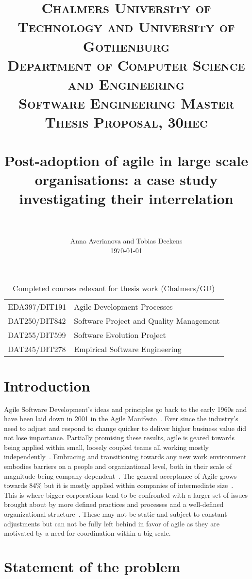 \documentclass[paper=a4, fontsize=11pt]{scrartcl}
\title{
		\usefont{OT1}{bch}{b}{n}
		\normalfont \normalsize \textsc{Chalmers University of Technology and University of Gothenburg} \\
        \normalfont \normalsize \textsc{Department of Computer Science and Engineering} \\
        \normalfont \normalsize \textsc{Software Engineering Master Thesis Proposal, 30hec
}\\[25pt]
		\horrule{0.5pt} \\[0.4cm]
		\huge Post-adoption of agile in large scale organisations: a case study investigating their interrelation \\
		\horrule{2pt} \\[0.5cm]
}
\author{
		\normalfont 				                     \normalsize
      Anna Averianova and Tobias Deekens\\[-3pt]	\normalsize
      \today
}
\date{}
\numberwithin{equation}{section}		%
\numberwithin{figure}{section}			%
\numberwithin{table}{section}			%
\begin{document}
\maketitle

\begin{table}[h]
	\centering
    \begin{tabular}{ll}
    EDA397/DIT191  & Agile Development Processes             \\
    DAT250/DIT842  & Software Project and Quality Management \\
    DAT255/DIT599  & Software Evolution Project              \\
    DAT245/DIT278  & Empirical Software Engineering          \\
    \end{tabular}
    \caption {Completed courses relevant for thesis work (Chalmers/GU)}
\end{table}

\section{Introduction}

Agile Software Development's ideas and principles go back to the early 1960s and have been laid down in 2001 in the Agile Manifesto~\citep{beck2001agile}. Ever since the industry's need to adjust and respond to change quicker to deliver higher business value did not lose importance. Partially promising these results, agile is geared towards being applied within small, loosely coupled teams all working mostly independently~\citep{stober2009agile}. Embracing and transitioning towards any new work environment embodies barriers on a people and organizational level, both in their scale of magnitude being company dependent~\citep{schiel2009enterprise}. The general acceptance of Agile grows towards 84\% but it is mostly applied within companies of intermediate size~\citep{7thagilesur}. This is where bigger corporations tend to be confronted with a larger set of issues brought about by more defined practices and processes and a well-defined organizational structure~\citep{schiel2009enterprise}. These may not be static and subject to constant adjustments but can not be fully left behind in favor of agile as they are motivated by a need for coordination within a big scale.

\section{Statement of the problem}
\end{document}
